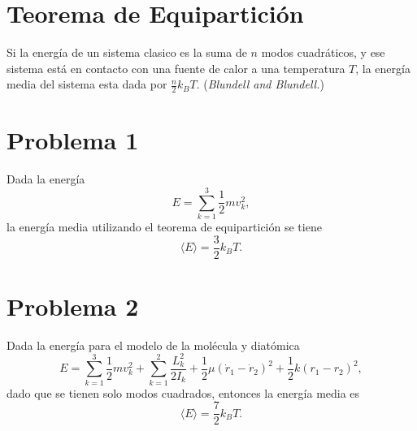 \section{Teorema de Equipartición}
Si la energía de un sistema clasico es la suma de $n$ modos cuadráticos, y ese sistema está en contacto con una fuente de calor a una temperatura $T$, la energía media del sistema esta dada por $\frac{n}{2} k_B T$. (\textit{Blundell and Blundell.})

\section{Problema 1}
Dada la energía
	$$ E = \sum _{k = 1} ^3 \frac{1}{2} mv_k ^2, $$
la energía media utilizando el teorema de equipartición se tiene
	$$ \boxed{\langle E \rangle = \frac{3}{2} k_B T.} $$




\section{Problema 2}
Dada la energía para el modelo de la molécula y diatómica
	$$ E = \sum _{k = 1} ^3 \frac{1}{2} mv_k ^2 + \sum _{k = 1} ^2 \frac{L_k ^2}{2I_k} + \frac{1}{2} \mu (\dot{r} _1 - \dot{r}_2)^2 + \frac{1}{2} k(r_1 - r_2)^2, $$
dado que se tienen solo modos cuadrados, entonces la energía media es
	$$ \boxed{\langle E \rangle = \frac{7}{2} k_B T.} $$